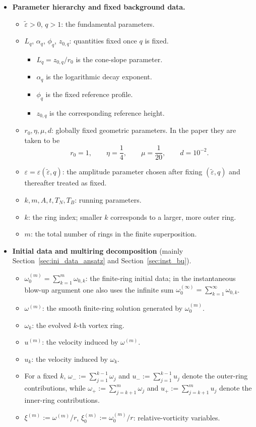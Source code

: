 \documentclass[reqno,11pt]{amsart}
\begin{document}
\begin{itemize}
\item \textbf{Parameter hierarchy and fixed background data.}
\begin{itemize}
    \item $\tilde\varepsilon>0$, $q>1$: the fundamental parameters.
    \item $L_q$, $\alpha_q$, $\phi_q$, $z_{0,q}$: quantities fixed once $q$ is fixed.
    \begin{itemize}
        \item $L_q=z_{0,q}/r_0$ is the cone-slope parameter.
        \item $\alpha_q$ is the logarithmic decay exponent.
        \item $\phi_q$ is the fixed reference profile.
        \item $z_{0,q}$ is the corresponding reference height.
    \end{itemize}
    \item $r_0,\eta,\mu,d$: globally fixed geometric parameters. In the paper they are taken to be
    \[
        r_0=1,\qquad \eta=\frac14,\qquad \mu=\frac1{20},\qquad d=10^{-2}.
    \]
    \item $\varepsilon=\varepsilon(\tilde\varepsilon,q)$: the amplitude parameter chosen after fixing $(\tilde\varepsilon,q)$ and thereafter treated as fixed.
    \item $k,m,A,t,T_N,T_B$: running parameters.
    \item $k$: the ring index; smaller $k$ corresponds to a larger, more outer ring.
    \item  $m$: the total number of rings in the finite superposition. 
\end{itemize}

\item \textbf{Initial data and multiring decomposition}
(mainly Section~\ref{sec:ini_data_ansatz} and Section~\ref{sec:inst_bu}).
\begin{itemize}
    \item $\omega_0^{(m)}=\sum_{k=1}^m \omega_{0,k}$: the finite-ring initial data; in the instantaneous blow-up argument one also uses the infinite sum  $\omega_0^{(\infty)}=\sum_{k=1}^\infty \omega_{0,k}$.
    \item $\omega^{(m)}$: the smooth finite-ring solution generated by $\omega_0^{(m)}$.
    \item $\omega_k$: the evolved $k$-th vortex ring.
    \item $u^{(m)}$: the velocity induced by $\omega^{(m)}$.
    \item $u_k$: the velocity induced by $\omega_k$.
    \item For a fixed $k$, $\omega_-:=\sum_{j=1}^{k-1}\omega_j$ and $u_-:=\sum_{j=1}^{k-1}u_j$
    denote the outer-ring contributions, while $\omega_+:=\sum_{j=k+1}^m\omega_j$ and $u_+:=\sum_{j=k+1}^mu_j$
    denote the inner-ring contributions.
    \item $\xi^{(m)}:=\omega^{(m)}/r$, $\xi_0^{(m)}:=\omega_0^{(m)}/r$: relative-vorticity variables.
\end{itemize}


\end{itemize}
\end{document}

